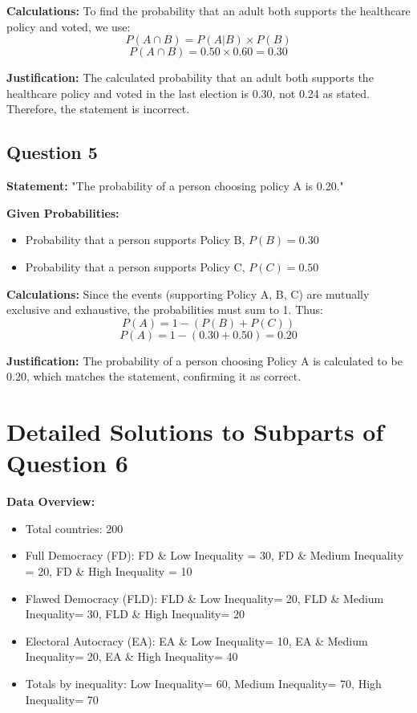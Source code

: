 \documentclass{article}
\begin{document}
\textbf{Calculations:}
To find the probability that an adult both supports the healthcare policy and voted, we use:
\[ P(A \cap B) = P(A|B) \times P(B) \]
\[ P(A \cap B) = 0.50 \times 0.60 = 0.30 \]

\textbf{Justification:}
The calculated probability that an adult both supports the healthcare policy and voted in the last election is 0.30, not 0.24 as stated. Therefore, the statement is incorrect.

\subsection*{Question 5}
\textbf{Statement:} "The probability of a person choosing policy A is 0.20."

\textbf{Given Probabilities:}
\begin{itemize}
    \item Probability that a person supports Policy B, \( P(B) = 0.30 \)
    \item Probability that a person supports Policy C, \( P(C) = 0.50 \)
\end{itemize}

\textbf{Calculations:}
Since the events (supporting Policy A, B, C) are mutually exclusive and exhaustive, the probabilities must sum to 1. Thus:
\[ P(A) = 1 - (P(B) + P(C)) \]
\[ P(A) = 1 - (0.30 + 0.50) = 0.20 \]

\textbf{Justification:}
The probability of a person choosing Policy A is calculated to be 0.20, which matches the statement, confirming it as correct.

\section*{Detailed Solutions to Subparts of Question 6}

\textbf{Data Overview:}
\begin{itemize}
    \item Total countries: 200
    \item Full Democracy (FD): FD \& Low Inequality = 30, FD \& Medium Inequality = 20, FD \& High Inequality = 10
    \item Flawed Democracy (FLD): FLD \& Low Inequality= 20, FLD \& Medium Inequality= 30, FLD \& High Inequality= 20
    \item Electoral Autocracy (EA): EA \& Low Inequality= 10, EA \& Medium Inequality= 20, EA \& High Inequality= 40
    \item Totals by inequality: Low Inequality= 60, Medium Inequality= 70, High Inequality= 70
\end{itemize}
\end{document}
